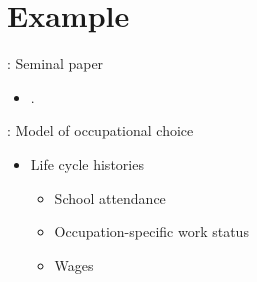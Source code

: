 \section{Example}
\begin{frame}{\insertsection: Seminal paper}
\begin{itemize}
	\item {}.
\end{itemize}
\end{frame}
\begin{frame}{\insertsection: Model of occupational choice}

\begin{itemize}
\item Life cycle histories
\begin{itemize}
\item School attendance
\item Occupation-specific work status
\item Wages
\end{itemize}
\end{itemize}
\end{frame}

